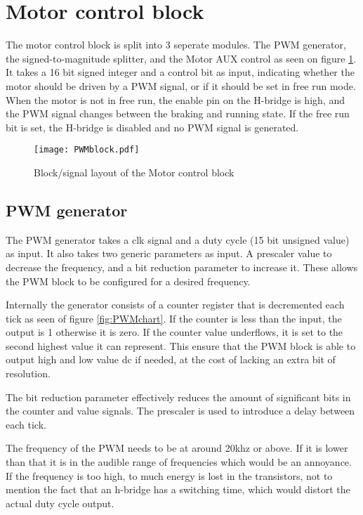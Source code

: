 \section{Motor control block}


The motor control block is split into 3 seperate modules.
The PWM generator, the signed-to-magnitude splitter, and the Motor AUX control as seen on figure \ref{fig:PWMblock}.
It takes a 16 bit signed integer and a control bit as input, indicating whether the motor should be driven by a PWM signal, or if it should be set in free run mode. 
When the motor is not in free run, the enable pin on the H-bridge is high, and the PWM signal changes between the braking and running state. If the free run bit is set, the H-bridge is disabled and no PWM signal is generated.

\begin{figure}[htb]
\centering
\texttt{[image: PWMblock.pdf]}
\caption{Block/signal layout of the Motor control block}
\label{fig:PWMblock}
\end{figure}

\subsection{PWM generator}
The PWM generator takes a clk signal and a duty cycle (15 bit unsigned value) as input. It also takes two generic parameters as input. A prescaler value to decrease the frequency, and a bit reduction parameter to increase it. These allows the PWM block to be configured for a desired frequency.

Internally the generator consists of a counter register that is decremented each tick as seen of figure \ref{fig:PWMchart}. If the counter is less than the input, the output is 1 otherwise it is zero.
If the counter value underflows, it is set to the second highest value it can represent. This ensure that the PWM block is able to output high and low value dc if needed, at the cost of lacking an extra bit of resolution.

The bit reduction parameter effectively reduces the amount of significant bits in the counter and value signals.
The prescaler is used to introduce a delay between each tick.

The frequency of the PWM needs to be at around 20khz or above. If it is lower than that it is in the audible range of frequencies which would be an annoyance. If the frequency is too high, to much energy is lost in the transistors, not to mention the fact that an h-bridge has a switching time, which would distort the actual duty cycle output.

